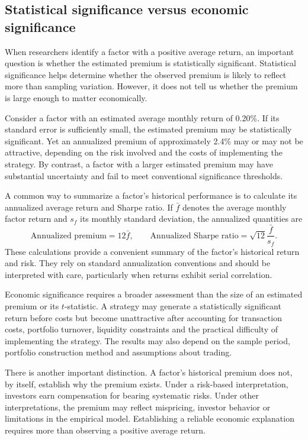 \subsection{Statistical significance versus economic significance}
\label{subsec:03-statistical-economic-significance}

When researchers identify a factor with a positive average return, an important question is whether the estimated premium is statistically significant. Statistical significance helps determine whether the observed premium is likely to reflect more than sampling variation. However, it does not tell us whether the premium is large enough to matter economically.

Consider a factor with an estimated average monthly return of 0.20\%. If its standard error is sufficiently small, the estimated premium may be statistically significant. Yet an annualized premium of approximately 2.4\% may or may not be attractive, depending on the risk involved and the costs of implementing the strategy. By contrast, a factor with a larger estimated premium may have substantial uncertainty and fail to meet conventional significance thresholds.

A common way to summarize a factor's historical performance is to calculate its annualized average return and Sharpe ratio. If $\bar{f}$ denotes the average monthly factor return and $s_f$ its monthly standard deviation, the annualized quantities are
\begin{equation}
  \text{Annualized premium}=12\bar{f},
  \qquad
  \text{Annualized Sharpe ratio}
  =\sqrt{12}\frac{\bar{f}}{s_f}.
  \label{eq:03-factor-sharpe}
\end{equation}
These calculations provide a convenient summary of the factor's historical return and risk. They rely on standard annualization conventions and should be interpreted with care, particularly when returns exhibit serial correlation.

Economic significance requires a broader assessment than the size of an estimated premium or its $t$-statistic. A strategy may generate a statistically significant return before costs but become unattractive after accounting for transaction costs, portfolio turnover, liquidity constraints and the practical difficulty of implementing the strategy. The results may also depend on the sample period, portfolio construction method and assumptions about trading.

There is another important distinction. A factor's historical premium does not, by itself, establish why the premium exists. Under a risk-based interpretation, investors earn compensation for bearing systematic risks. Under other interpretations, the premium may reflect mispricing, investor behavior or limitations in the empirical model. Establishing a reliable economic explanation requires more than observing a positive average return.

